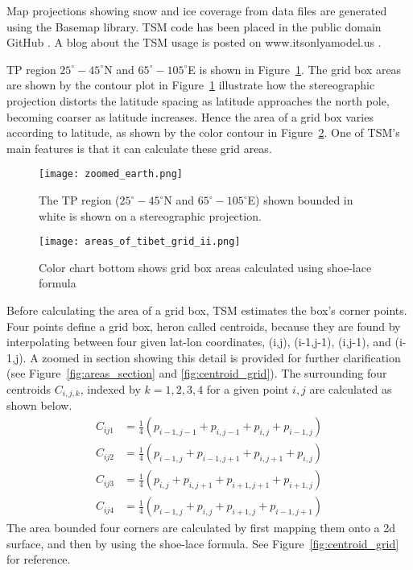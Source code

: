 Map projections showing snow and ice coverage from data files are generated using the Basemap library. TSM code has been placed in the public domain GitHub \cite{git_proj}. A blog about the TSM usage is posted on www.itsonlyamodel.us \cite{tibet_snow_man}.

TP region $25^{\circ}-45^{\circ}$N and $65^{\circ}-105^{\circ}$E is shown in Figure~\ref{fig:show_grid}. The grid box areas are shown by the contour plot in Figure~\ref{fig:show_grid} illustrate how the stereographic projection distorts the latitude spacing as latitude approaches the north pole, becoming coarser as latitude increases. Hence the area of a grid box varies according to latitude, as shown by the color contour in Figure~\ref{fig:areas_row_col}. One of TSM's main features is that it can calculate these grid areas.

\begin{figure}[ht]
\centering
\begin{minipage}{4.5in}
\texttt{[image: zoomed\_earth.png]}\\
\caption{The TP region ($25^{\circ}-45^{\circ}$N and $65^{\circ}-105^{\circ}$E) shown bounded in white is shown on a stereographic projection.}
\label{fig:show_grid}
\end{minipage}
\end{figure}

\begin{figure}[ht]
\centering
\begin{minipage}{6in}
\texttt{[image: areas\_of\_tibet\_grid\_ii.png]}
\caption{Color chart bottom shows grid box areas calculated using shoe-lace formula}
\label{fig:areas_row_col}
\end{minipage}
\end{figure}

Before calculating the area of a grid box, TSM estimates the box's corner points. Four points define a grid box, heron called centroids, because they are found by interpolating between four given lat-lon coordinates, (i,j), (i-1,j-1), (i,j-1), and (i-1,j). A zoomed in section showing this detail is provided for further clarification (see Figure~\ref{fig:areas_section} and \ref{fig:centroid_grid}). 
The surrounding four centroids $C_{i,j,k}$, indexed by $k=1,2,3,4$ for a given point $i,j$ are calculated as shown below.
\begin{align}
C_{ij1} &= \frac{1}{4}( p_{i-1,j-1}+ p_{i,j-1}+ p_{i,j} + p_{i-1,j} ) \\
C_{ij2} &= \frac{1}{4}( p_{i-1,j}+ p_{i-1,j+1} + p_{i,j+1}+ p_{i,j} ) \\
C_{ij3} &= \frac{1}{4}( p_{i,j}+ p_{i,j+1} + p_{i+1,j+1}+ p_{i+1,j} ) \\
C_{ij4} &= \frac{1}{4}( p_{i-1,j}+ p_{i,j} + p_{i+1,j} + p_{i-1,j+1} )
\end{align}
The area bounded four corners are calculated by first mapping them onto a 2d surface, and then by using the shoe-lace formula. See Figure~\ref{fig:centroid_grid} for reference.

